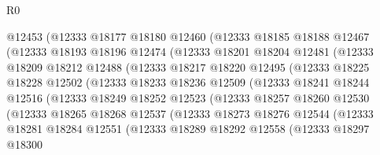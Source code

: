 \begin{lexlean}{R0}
\begin{coremodule}
                  @12453
                  (@12333
                    @18177
                    @18180
                    @12460
                    (@12333
                      @18185
                      @18188
                      @12467
                      (@12333
                        @18193
                        @18196
                        @12474
                        (@12333
                          @18201
                          @18204
                          @12481
                          (@12333
                            @18209
                            @18212
                            @12488
                            (@12333
                              @18217
                              @18220
                              @12495
                              (@12333
                                @18225
                                @18228
                                @12502
                                (@12333
                                  @18233
                                  @18236
                                  @12509
                                  (@12333
                                    @18241
                                    @18244
                                    @12516
                                    (@12333
                                      @18249
                                      @18252
                                      @12523
                                      (@12333
                                        @18257
                                        @18260
                                        @12530
                                        (@12333
                                          @18265
                                          @18268
                                          @12537
                                          (@12333
                                            @18273
                                            @18276
                                            @12544
                                            (@12333
                                              @18281
                                              @18284
                                              @12551
                                              (@12333
                                                @18289
                                                @18292
                                                @12558
                                                (@12333
                                                  @18297
                                                  @18300

\end{coremodule}
\end{lexlean}
